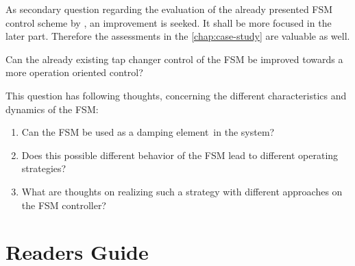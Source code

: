 As secondary question regarding the evaluation of the already presented \acs{FSM} control scheme by \textcite{burlakin_2024}, an improvement is seeked.
It shall be more focused in the later part.
Therefore the assessments in the \autoref{chap:case-study} are valuable as well.

\begin{tcolorbox}[float, colback=ees_green!5!white,colframe=ees_green, toptitle=1mm, bottomtitle=1mm, left=2mm, right=2.5mm, top=2mm, bottom=2mm, title={\textbf{Additional Question of this Thesis}}]
    Can the already existing tap changer control of the \acf{FSM} be improved towards a more operation oriented control?
\end{tcolorbox}

This question has following thoughts, concerning the different characteristics and dynamics of the \acs{FSM}:
\begin{enumerate}
    \item Can the \acs{FSM} be used as a \glqq damping element\grqq~in the system?
    \item Does this possible different behavior of the \acs{FSM} lead to different operating strategies?
    \item What are thoughts on realizing such a strategy with different approaches on the \acs{FSM} controller?
\end{enumerate}

\section{Readers Guide}


